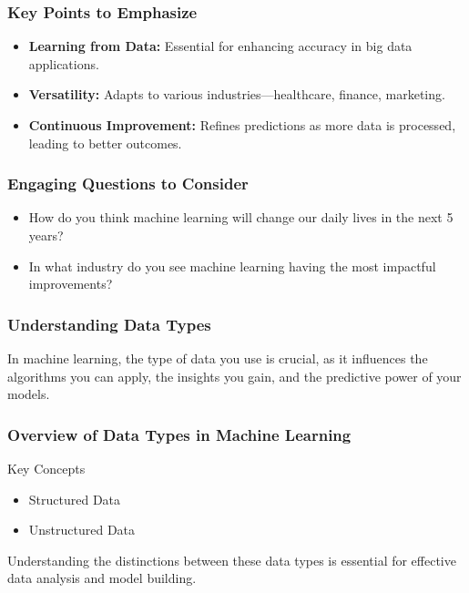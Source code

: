 \documentclass[aspectratio=169]{beamer}
\begin{document}
\begin{frame}[fragile]
    \frametitle{Key Points to Emphasize}
    \begin{itemize}
        \item \textbf{Learning from Data:} Essential for enhancing accuracy in big data applications.
        \item \textbf{Versatility:} Adapts to various industries—healthcare, finance, marketing.
        \item \textbf{Continuous Improvement:} Refines predictions as more data is processed, leading to better outcomes.
    \end{itemize}
\end{frame}

\begin{frame}[fragile]
    \frametitle{Engaging Questions to Consider}
    \begin{itemize}
        \item How do you think machine learning will change our daily lives in the next 5 years?
        \item In what industry do you see machine learning having the most impactful improvements?
    \end{itemize}
\end{frame}

\begin{frame}[fragile]
    \frametitle{Understanding Data Types}
    In machine learning, the type of data you use is crucial, as it influences the algorithms you can apply, the insights you gain, and the predictive power of your models.
\end{frame}

\begin{frame}[fragile]
    \frametitle{Overview of Data Types in Machine Learning}
    \begin{block}{Key Concepts}
        \begin{itemize}
            \item Structured Data
            \item Unstructured Data
        \end{itemize}
    \end{block}
    Understanding the distinctions between these data types is essential for effective data analysis and model building.
\end{frame}
\end{document}
